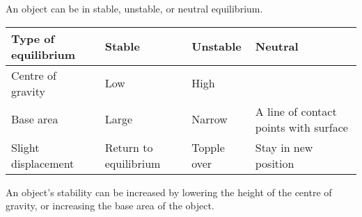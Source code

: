 \documentclass[../main.tex]{subfiles}
\begin{document}
	
		An object can be in stable, unstable, or neutral equilibrium.
		\begin{center}
		\begin{tabularx}{0.85\linewidth}{X|XXX}
			\hline \hline
			Type of equilibrium & Stable & Unstable & Neutral \\
			\hline
			Centre of gravity & Low & High & \\
			Base area & Large & Narrow & A line of contact points with surface \\
			Slight displacement & Return to equilibrium & Topple over & Stay in new position \\
			\hline \hline
		\end{tabularx}
		\end{center}
	
		An object's stability can be increased by lowering the height of the centre of gravity, or increasing the base area of the object.
\end{document}
